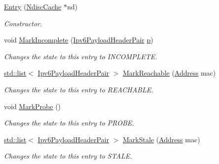 \begin{DoxyCompactItemize}
\item 
\hyperlink{classns3_1_1NdiscCache_1_1Entry_aceddf1512e71fbcfa8e774efa0607653}{Entry} (\hyperlink{classns3_1_1NdiscCache}{Ndisc\+Cache} $\ast$nd)
\begin{DoxyCompactList}\small\item\em Constructor. \end{DoxyCompactList}\item 
void \hyperlink{classns3_1_1NdiscCache_1_1Entry_aa7a9f3b2c4513bf61f286c8cbfea64bb}{Mark\+Incomplete} (\hyperlink{classns3_1_1NdiscCache_a29c07f4c9da0e923f442f6440666240e}{Ipv6\+Payload\+Header\+Pair} \hyperlink{lte__link__budget__x2__handover__measures_8m_ac9de518908a968428863f829398a4e62}{p})
\begin{DoxyCompactList}\small\item\em Changes the state to this entry to I\+N\+C\+O\+M\+P\+L\+E\+TE. \end{DoxyCompactList}\item 
\hyperlink{openflow-interface_8h_afd9bcfa176617760671b67580f536fa7}{std\+::list}$<$ \hyperlink{classns3_1_1NdiscCache_a29c07f4c9da0e923f442f6440666240e}{Ipv6\+Payload\+Header\+Pair} $>$ \hyperlink{classns3_1_1NdiscCache_1_1Entry_a8d450a952c5f6ce86912190e405591a0}{Mark\+Reachable} (\hyperlink{classns3_1_1Address}{Address} mac)
\begin{DoxyCompactList}\small\item\em Changes the state to this entry to R\+E\+A\+C\+H\+A\+B\+LE. \end{DoxyCompactList}\item 
void \hyperlink{classns3_1_1NdiscCache_1_1Entry_a06348b0f630fd26c48e6da0284dddaa1}{Mark\+Probe} ()
\begin{DoxyCompactList}\small\item\em Changes the state to this entry to P\+R\+O\+BE. \end{DoxyCompactList}\item 
\hyperlink{openflow-interface_8h_afd9bcfa176617760671b67580f536fa7}{std\+::list}$<$ \hyperlink{classns3_1_1NdiscCache_a29c07f4c9da0e923f442f6440666240e}{Ipv6\+Payload\+Header\+Pair} $>$ \hyperlink{classns3_1_1NdiscCache_1_1Entry_a2b9c0d5d4534f896c0909c1ce856dbe5}{Mark\+Stale} (\hyperlink{classns3_1_1Address}{Address} mac)
\begin{DoxyCompactList}\small\item\em Changes the state to this entry to S\+T\+A\+LE. \end{DoxyCompactList}\item 

\end{DoxyCompactItemize}
